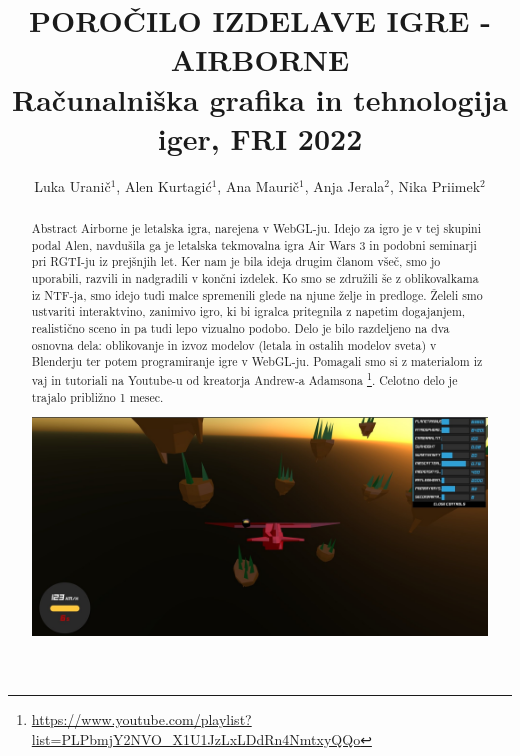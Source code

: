\documentclass[a4paper]{article}
\begin{document}
\title{POROČILO IZDELAVE IGRE - AIRBORNE \\
 Računalniška grafika in tehnologija iger, FRI 2022}

\author{Luka Uranič$^{1}$, Alen Kurtagić$^{1}$,  Ana Maurič$^{1}$,  Anja Jerala$^{2}$,  Nika Priimek$^{2}$} %



\maketitle


\begin{abstract}{Abstract}%
Airborne je letalska igra, narejena v WebGL-ju. Idejo za igro je v tej skupini podal Alen, navdušila ga je letalska tekmovalna igra Air Wars 3 in podobni seminarji pri RGTI-ju iz prejšnjih let. Ker nam je bila ideja drugim članom všeč, smo jo uporabili, razvili in nadgradili v končni izdelek. Ko smo se združili še z oblikovalkama iz NTF-ja, smo idejo tudi malce spremenili glede na njune želje in predloge. Želeli smo ustvariti interaktvino, zanimivo igro, ki bi igralca pritegnila z napetim dogajanjem, realistično sceno in pa tudi lepo vizualno podobo. Delo je bilo razdeljeno na dva osnovna dela: oblikovanje in izvoz modelov (letala in ostalih modelov sveta) v Blenderju ter potem programiranje igre v WebGL-ju. Pomagali smo si z materialom iz vaj in tutoriali na Youtube-u od kreatorja Andrew-a Adamsona \footnote{\url{https://www.youtube.com/playlist?list=PLPbmjY2NVO_X1U1JzLxLDdRn4NmtxyQQo}}. Celotno delo je trajalo približno 1 mesec. 
\begin{center}
     \includegraphics[width=\columnwidth]{igra.jpg}
\end{center}
\end{abstract}
\end{document}
